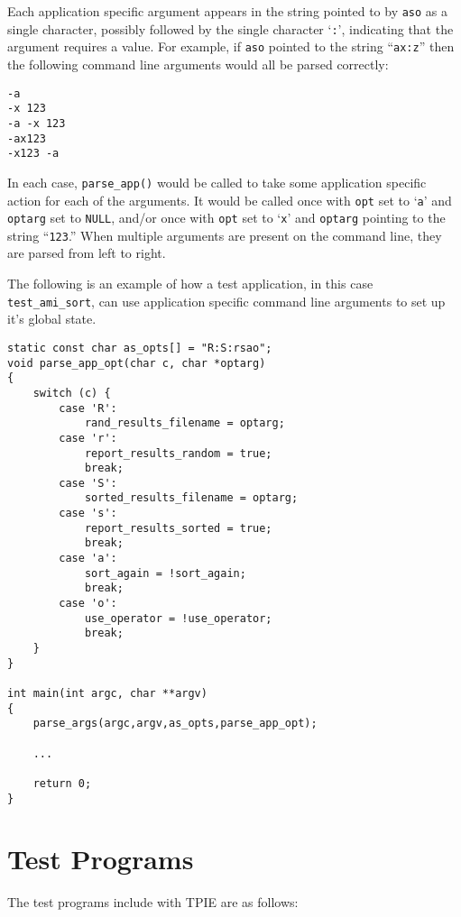 Each application specific argument appears in the string pointed to by
\verb|aso| as a single character, possibly followed by the single
character `\verb|:|', indicating that the argument requires a value.
For example, if \verb|aso| pointed to the string ``\verb|ax:z|'' then the
following command line arguments would all be parsed correctly:
\begin{description}
\item[\verb|-a|]
\item[\verb|-x 123|]
\item[\verb|-a -x 123|]
\item[\verb|-ax123|]
\item[\verb|-x123 -a|]
\end{description}
In each case, \verb|parse_app()| would be called to take some
application specific action for each of the arguments.  It would be
called once with \verb|opt| set to `\verb|a|' and \verb|optarg| set to
\verb|NULL|, and/or once with \verb|opt| set to `\verb|x|' and
\verb|optarg| pointing to the string ``\verb|123|.''  When multiple arguments
are present on the command line, they are parsed from left to right.

The following is an example of how a test application, in this case
\verb|test_ami_sort|, can use application specific command line
arguments to set up it's global state.

\begin{verbatim}
static const char as_opts[] = "R:S:rsao";
void parse_app_opt(char c, char *optarg)
{
    switch (c) {
        case 'R':
            rand_results_filename = optarg;
        case 'r':
            report_results_random = true;
            break;
        case 'S':
            sorted_results_filename = optarg;
        case 's':
            report_results_sorted = true;
            break;
        case 'a':
            sort_again = !sort_again;
            break;
        case 'o':
            use_operator = !use_operator;
            break;
    }
}

int main(int argc, char **argv)
{
    parse_args(argc,argv,as_opts,parse_app_opt);

    ...

    return 0;
}
\end{verbatim}

\section{Test Programs}

The test programs include with TPIE are as follows:

